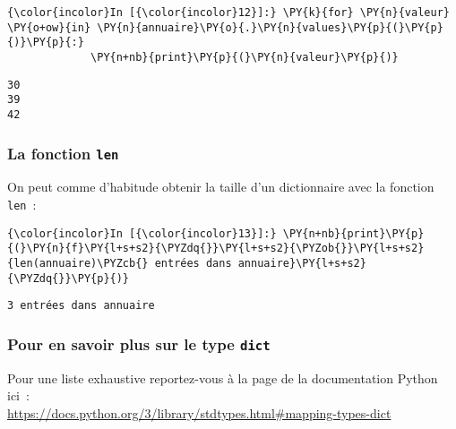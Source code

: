     \begin{Verbatim}[commandchars=\\\{\}]
{\color{incolor}In [{\color{incolor}12}]:} \PY{k}{for} \PY{n}{valeur} \PY{o+ow}{in} \PY{n}{annuaire}\PY{o}{.}\PY{n}{values}\PY{p}{(}\PY{p}{)}\PY{p}{:}
             \PY{n+nb}{print}\PY{p}{(}\PY{n}{valeur}\PY{p}{)}
\end{Verbatim}


    \begin{Verbatim}[commandchars=\\\{\}]
30
39
42

    \end{Verbatim}

    \hypertarget{la-fonction-len}{%
\subsubsection{\texorpdfstring{La fonction
\texttt{len}}{La fonction len}}\label{la-fonction-len}}

    On peut comme d'habitude obtenir la taille d'un dictionnaire avec la
fonction \texttt{len}~:

    \begin{Verbatim}[commandchars=\\\{\}]
{\color{incolor}In [{\color{incolor}13}]:} \PY{n+nb}{print}\PY{p}{(}\PY{n}{f}\PY{l+s+s2}{\PYZdq{}}\PY{l+s+s2}{\PYZob{}}\PY{l+s+s2}{len(annuaire)\PYZcb{} entrées dans annuaire}\PY{l+s+s2}{\PYZdq{}}\PY{p}{)}
\end{Verbatim}


    \begin{Verbatim}[commandchars=\\\{\}]
3 entrées dans annuaire

    \end{Verbatim}

    \hypertarget{pour-en-savoir-plus-sur-le-type-dict}{%
\subsubsection{\texorpdfstring{Pour en savoir plus sur le type
\texttt{dict}}{Pour en savoir plus sur le type dict}}\label{pour-en-savoir-plus-sur-le-type-dict}}

    Pour une liste exhaustive reportez-vous à la page de la documentation
Python ici~:\\

\href{https://docs.python.org/3/library/stdtypes.html\#mapping-types-dict}{https://docs.python.org/3/library/stdtypes.html\#mapping-types-dict}

